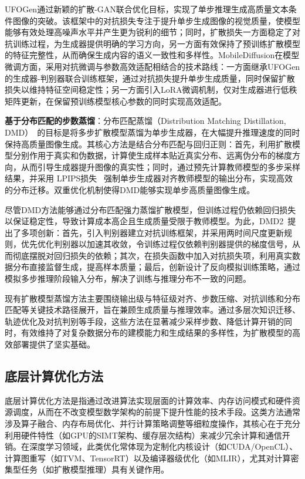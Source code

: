 \documentclass[11pt,a4paper,UTF8]{ctexart}
\begin{document}
UFOGen\cite{xu2024ufogen}通过新颖的扩散-GAN联合优化目标，实现了单步推理生成高质量文本条件图像的突破。该框架中的对抗损失专注于提升单步生成图像的视觉质量，使模型能够有效处理高噪声水平并产生更为锐利的细节；同时，扩散损失一方面稳定了对抗训练过程，为生成器提供明确的学习方向，另一方面有效保持了预训练扩散模型的特征完整性，从而确保生成内容的语义一致性和多样性。MobileDiffusion\cite{zhao2024mobilediffusion}在模型微调方面，采用对抗微调与参数高效适配相结合的技术路线：一方面继承UFOGen\cite{xu2024ufogen}的生成器-判别器联合训练框架，通过对抗损失提升单步生成质量，同时保留扩散损失以维持特征空间稳定性；另一方面引入LoRA\cite{hu2022lora}微调机制，仅对生成器进行低秩矩阵更新，在保留预训练模型核心参数的同时实现高效适配。

\textbf{基于分布匹配的步数蒸馏}：分布匹配蒸馏（Distribution Matching Distillation, DMD）~\cite{yin2024one}的目标是将多步扩散模型蒸馏为单步生成器，在大幅提升推理速度的同时保持高质量图像生成。其核心方法是结合分布匹配与回归正则：首先，利用扩散模型分别作用于真实和伪数据，计算使生成样本贴近真实分布、远离伪分布的梯度方向，从而引导生成器提升图像的真实性；同时，通过预先计算教师模型的多步采样结果，并采用 LPIPS损失~\cite{zhang2018unreasonable} 强制单步生成器对齐教师模型的输出分布，实现高效的分布迁移。双重优化机制使得DMD能够实现单步高质量图像生成。

尽管DMD方法能够通过分布匹配强力蒸馏扩散模型，但训练过程仍依赖回归损失以保证稳定性，导致计算成本高企且生成质量受限于教师模型。为此，DMD2~\cite{yin2024improved}提出了多项创新：首先，引入判别器建立对抗训练框架，并采用两时间尺度更新规则，优先优化判别器以加速其收敛，令训练过程仅依赖判别器提供的梯度信号，从而彻底摆脱对回归损失的依赖；其次，在损失函数中加入对抗损失项，利用真实数据分布直接监督生成，提高样本质量；最后，创新设计了反向模拟训练策略，通过模拟多步推理阶段输入分布，解决了训练与推理分布不一致的问题。

现有扩散模型蒸馏方法主要围绕输出级与特征级对齐、步数压缩、对抗训练和分布匹配等关键技术路径展开，旨在兼顾生成质量与推理效率。通过多层次知识迁移、轨迹优化及对抗判别等手段，这些方法在显著减少采样步数、降低计算开销的同时，有效维持了对复杂数据分布的建模能力和生成结果的多样性，为扩散模型的高效部署提供了坚实基础。

\subsection{底层计算优化方法}

底层计算优化方法是指通过改进算法实现层面的计算效率、内存访问模式和硬件资源调度，从而在不改变模型数学架构的前提下提升性能的技术手段。这类方法通常涉及算子融合、内存布局优化、并行计算策略调整等细粒度操作，其核心在于充分利用硬件特性（如GPU的SIMT架构、缓存层次结构）来减少冗余计算和通信开销。在深度学习领域，此类优化常体现为定制化内核设计（如CUDA/OpenCL）、计算图重写（如TVM\cite{TVM}、TensorRT）以及编译器级优化（如MLIR\cite{mlir}），尤其对计算密集型任务（如扩散模型推理）具有关键作用。
\end{document}
